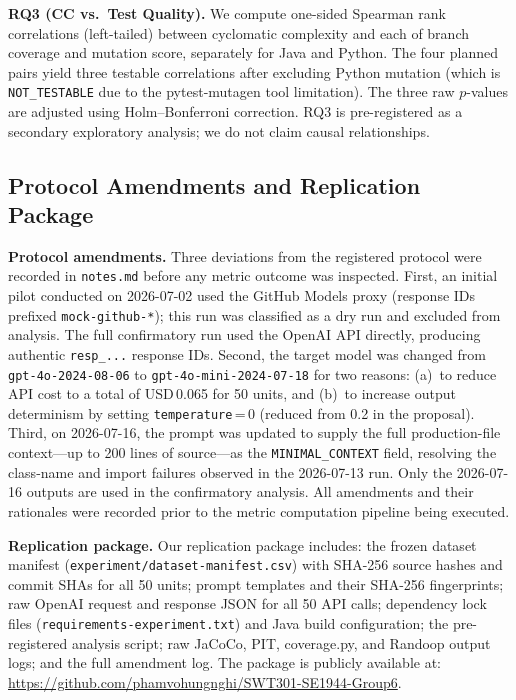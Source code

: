 \textbf{RQ3 (CC vs.\ Test Quality).}
We compute one-sided Spearman rank correlations (left-tailed) between cyclomatic
complexity and each of branch coverage and mutation score, separately for Java and
Python.
The four planned pairs yield three testable correlations after excluding Python
mutation (which is \texttt{NOT\_TESTABLE} due to the pytest-mutagen tool
limitation).
The three raw $p$-values are adjusted using Holm--Bonferroni correction.
RQ3 is pre-registered as a secondary exploratory analysis; we do not claim causal
relationships.

\subsection{Protocol Amendments and Replication Package}
\label{subsec:amendments}

\textbf{Protocol amendments.}
Three deviations from the registered protocol were recorded in \texttt{notes.md}
before any metric outcome was inspected.
First, an initial pilot conducted on 2026-07-02 used the GitHub Models proxy
(response IDs prefixed \texttt{mock-github-*}); this run was classified as a dry
run and excluded from analysis.
The full confirmatory run used the OpenAI API directly, producing authentic
\texttt{resp\_...} response IDs.
Second, the target model was changed from \texttt{gpt-4o-2024-08-06} to
\texttt{gpt-4o-mini-2024-07-18} for two reasons: (a)~to reduce API cost to a
total of USD\,0.065 for 50 units, and (b)~to increase output determinism by
setting \texttt{temperature}\,=\,0 (reduced from 0.2 in the proposal).
Third, on 2026-07-16, the prompt was updated to supply the full production-file
context---up to 200 lines of source---as the \texttt{MINIMAL\_CONTEXT} field,
resolving the class-name and import failures observed in the 2026-07-13 run.
Only the 2026-07-16 outputs are used in the confirmatory analysis.
All amendments and their rationales were recorded prior to the metric computation
pipeline being executed.

\textbf{Replication package.}
Our replication package includes: the frozen dataset manifest
(\texttt{experiment/dataset-manifest.csv}) with SHA-256 source hashes and
commit SHAs for all 50 units; prompt templates and their SHA-256 fingerprints;
raw OpenAI request and response JSON for all 50 API calls; dependency lock files
(\texttt{requirements-experiment.txt}) and Java build configuration; the
pre-registered analysis script; raw JaCoCo, PIT, coverage.py, and Randoop output
logs; and the full amendment log.
The package is publicly available at:
\url{https://github.com/phamvohungnghi/SWT301-SE1944-Group6}.
